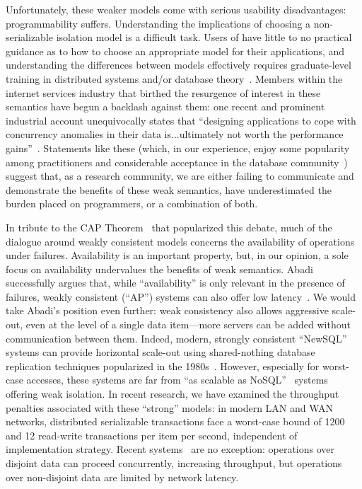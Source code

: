 \documentclass[9pt]{article}
\begin{document}
Unfortunately, these weaker models come with serious usability disadvantages: programmability suffers. Understanding the implications of choosing a non-serializable isolation model is a difficult task. Users of have little to no practical guidance as to how to choose an appropriate model for their applications, and understanding the differences between models effectively requires graduate-level training in distributed systems and/or database theory~\cite{consistency-borders}. Members within the internet services industry that birthed the resurgence of interest in these semantics have begun a backlash against them: one recent and prominent industrial account unequivocally states that ``designing applications to cope with concurrency anomalies in their data is...ultimately not worth the performance gains''~\cite{f1}. Statements like these (which, in our experience, enjoy some popularity among practitioners and considerable acceptance in the database community~\cite{stonebraker-blog}) suggest that, as a research community, we are either failing to communicate and demonstrate the benefits of these weak semantics, have underestimated the burden placed on programmers, or a combination of both.

 In tribute to the CAP Theorem~\cite{gilbert-cap} that popularized this debate, much of the dialogue around weakly consistent models concerns the availability of operations under failures. Availability is an important property, but, in our opinion, a sole focus on availability undervalues the benefits of weak semantics. Abadi successfully argues that, while ``availability'' is only relevant in the presence of failures, weakly consistent (``AP'') systems can also offer low latency~\cite{pacelc}. We would take Abadi's position even further: weak consistency also allows aggressive scale-out, even at the level of a single data item---more servers can be added without communication between them. Indeed, modern, strongly consistent ``NewSQL'' systems can provide horizontal scale-out using shared-nothing database replication techniques popularized in the 1980s~\cite{sharednothing}. However, especially for worst-case accesses, these systems are far from ``as scalable as NoSQL''~\cite{f1} systems offering weak isolation. In recent research, we have examined the throughput penalties associated with these ``strong'' models: in modern LAN and WAN networks, distributed serializable transactions face a worst-case bound of 1200 and 12 read-write transactions per item per second, independent of implementation strategy. Recent systems~\cite{spanner,f1} are no exception: operations over disjoint data can proceed concurrently, increasing throughput, but operations over non-disjoint data are limited by network latency.
\end{document}
